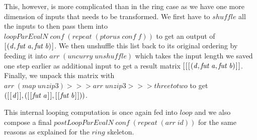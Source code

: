 \documentclass{jfp1}
\newcommand{\Varid}[1]{\mathit{#1}}
\begin{document}
This, however, is more complicated than in the ring case as we have one more dimension of inputs that needs to be transformed. We first have to \ensuremath{\Varid{shuffle}} all the inputs to then pass them into \ensuremath{\Varid{loopParEvalN}\;\Varid{conf}\;(\Varid{repeat}\;(\Varid{ptorus}\;\Varid{conf}\;\Varid{f}))} to get an output of \ensuremath{[\mskip1.5mu (\Varid{d},\Varid{fut}\;\Varid{a},\Varid{fut}\;\Varid{b})\mskip1.5mu]}. We then unshuffle this list back to its original ordering by feeding it into \ensuremath{\Varid{arr}\;(\Varid{uncurry}\;\Varid{unshuffle})} which takes the input length we saved one step earlier as additional input to get a result matrix \ensuremath{[\mskip1.5mu [\mskip1.5mu [\mskip1.5mu (\Varid{d},\Varid{fut}\;\Varid{a},\Varid{fut}\;\Varid{b})\mskip1.5mu]\mskip1.5mu]}. Finally, we unpack this matrix  with \ensuremath{\Varid{arr}\;(\Varid{map}\;\Varid{unzip3})\mathbin{>\!\!>\!\!>}\Varid{arr}\;\Varid{unzip3}\mathbin{>\!\!>\!\!>}\Varid{threetotwo}} to get \ensuremath{([\mskip1.5mu [\mskip1.5mu \Varid{d}\mskip1.5mu]\mskip1.5mu],([\mskip1.5mu [\mskip1.5mu \Varid{fut}\;\Varid{a}\mskip1.5mu]\mskip1.5mu],[\mskip1.5mu [\mskip1.5mu \Varid{fut}\;\Varid{b}\mskip1.5mu]\mskip1.5mu]))}.

This internal looping computation is once again fed into \ensuremath{\Varid{loop}} and we also compose a final \ensuremath{\Varid{postLoopParEvalN}\;\Varid{conf}\;(\Varid{repeat}\;(\Varid{arr}\;\Varid{id}))} for the same reasons as explained for the \ensuremath{\Varid{ring}} skeleton. 
\end{document}

